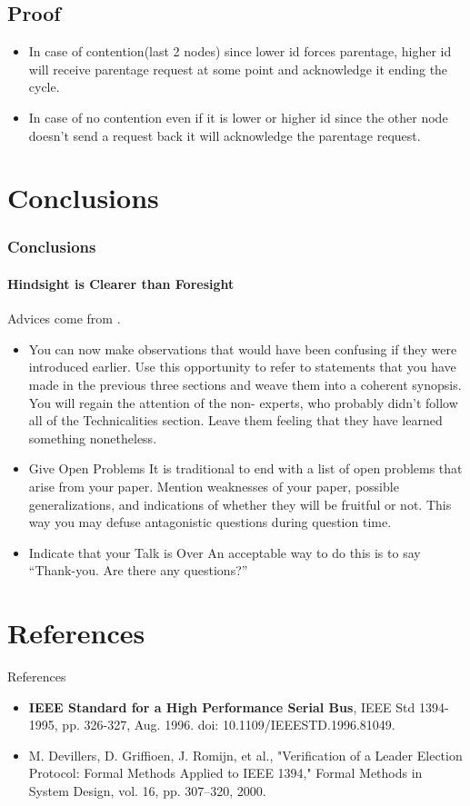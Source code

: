 \documentclass[11pt]{beamer}              %
\begin{document}
\subsection{Proof}
\begin{frame}
	\begin{itemize}
		\item In case of contention(last 2 nodes) since lower id forces parentage, higher id will receive parentage request at some point and acknowledge it ending the cycle.
		\item In case of no contention even if it is lower or higher id since the other node doesn't send a request back it will acknowledge the parentage request.
	\end{itemize}
\end{frame}



\section{Conclusions}
\begin{frame}
\frametitle{Conclusions}
\framesubtitle{Hindsight is Clearer than Foresight}
Advices come from \cite{spillman2000present}.
\begin{itemize}
\item You can now make observations that would have been confusing if they were introduced earlier. Use this opportunity to refer to statements that you have made in the previous three sections and weave them into a coherent synopsis. You will regain the attention of the non- experts, who probably didn’t follow all of the Technicalities section. Leave them feeling that they have learned something nonetheless.
\item Give Open Problems It is traditional to end with a list of open problems that arise from your paper. Mention weaknesses of your paper, possible generalizations, and indications of whether they will be fruitful or not. This way you may defuse antagonistic questions during question time.
\item Indicate that your Talk is Over
An acceptable way to do this is to say “Thank-you. Are there any questions?”\cite{einstein}
\end{itemize}

\end{frame}

\section*{References}
\begin{frame}{References}
    \tiny
    \begin{itemize}
        \item[\textbullet] \textbf{IEEE Standard for a High Performance Serial Bus}, IEEE Std 1394-1995, pp. 326-327, Aug. 1996. doi: 10.1109/IEEESTD.1996.81049.
        \item[\textbullet] M. Devillers, D. Griffioen, J. Romijn, et al., "Verification of a Leader Election Protocol: Formal Methods Applied to IEEE 1394," Formal Methods in System Design, vol. 16, pp. 307–320, 2000.
    \end{itemize}
\end{frame}
\end{document}
